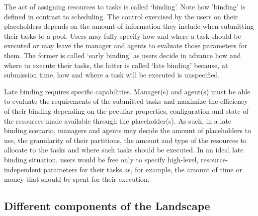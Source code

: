\documentclass{sig-alternate}
\begin{document}
  The act of
assigning resources to tasks is called `binding'. Note how 'binding'
is defined in contrast to scheduling.    The control exercised by
the users on their placeholders depends on the amount of information
they include when submitting their tasks to a pool. Users may fully
specify how and where a task should be executed or may leave the
manager and agents to evaluate those parameters for them. The former
is called `early binding' as users decide in advance how and where to
execute their tasks, the latter is called `late binding' because, at
submission time, how and where a task will be executed is unspecified.

Late binding requires specific capabilities. Manager(s) and agent(s)
must be able to evaluate the requirements of the submitted tasks and
maximize the efficiency of their binding depending on the peculiar
properties, configuration and state of the resources made available
through the placeholder(s). As such, in a late binding scenario,
managers and agents may decide the amount of placeholders to use, the
granularity of their partitions, the amount and type of the resources
to allocate to the tasks and where such tasks should be executed. In
an ideal late binding situation, users would be free only to specify
high-level, resource-independent parameters for their tasks as, for
example, the amount of time or money that should be spent for their
execution. 

\subsection{Different components of the Landscape}

\end{document}
